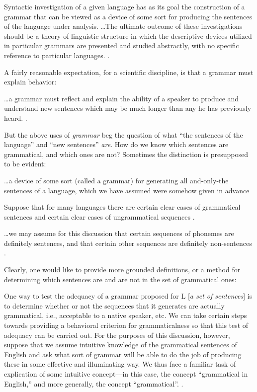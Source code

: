 Syntactic investigation of a given language has as its goal the construction of a grammar that can be viewed as a device of some sort for producing the sentences of the language under analysis. …The ultimate outcome of these investigations should be a theory of linguistic structure in which the descriptive devices utilized in particular grammars are presented and studied abstractly, with no specific reference to particular languages. \citep[11]{Chomsky1957}.

A fairly reasonable expectation, for a scientific discipline, is that a grammar must explain behavior:

…a grammar must reflect and explain the ability of a speaker to produce and understand new sentences which may be much longer than any he has previously heard. \citep[124]{Chomsky1956}.

  But the above uses of \textit{grammar} beg the question of what “the sentences of the language” and “new sentences” \textit{are}. How do we know which sentences are grammatical, and which ones are not? Sometimes the distinction is presupposed to be evident:

…a device of some sort (called a grammar) for generating all and-only-the sentences of a language, which we have assumed were somehow given in advance \citep[85]{Chomsky1957}

Suppose that for many languages there are certain clear cases of grammatical sentences and certain clear cases of ungrammatical sequences \citep[113]{Chomsky1956}.

…we may assume for this discussion that certain sequences of phonemes are definitely sentences, and that certain other sequences are definitely non-sentences \citep[14]{Chomsky1957}.

Clearly, one would like to provide more grounded definitions, or a method for determining which sentences are and are not in the set of grammatical ones:

One way to test the adequacy of a grammar proposed for L [\textit{a set of sentences}] is to determine whether or not the sequences that it generates are actually grammatical, i.e., acceptable to a native speaker, etc. We can take certain steps towards providing a behavioral criterion for grammaticalness so that this test of adequacy can be carried out. For the purposes of this discussion, however, suppose that we assume intuitive knowledge of the grammatical sentences of English and ask what sort of grammar will be able to do the job of producing these in some effective and illuminating way. We thus face a familiar task of explication of some intuitive concept—in this case, the concept “grammatical in English,” and more generally, the concept “grammatical”. \citep[13]{Chomsky1957}.

